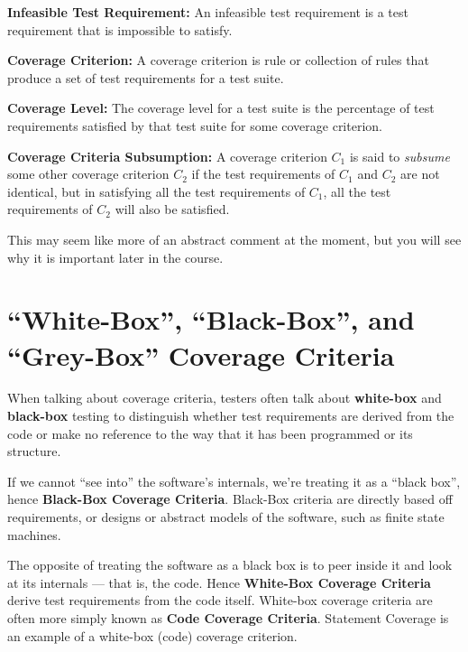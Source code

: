 
{\bf Infeasible Test Requirement:} An infeasible test requirement is a test
requirement that is impossible to satisfy.


{\bf Coverage Criterion:} A coverage criterion is rule or collection of rules
that produce a set of test requirements for a test suite.

{\bf Coverage Level:} The coverage level for a test suite is the percentage of
test requirements satisfied by that test suite for some coverage criterion.


{\bf Coverage Criteria Subsumption:} A coverage criterion $C_1$ is said to {\it
subsume} some other coverage criterion $C_2$ if the test requirements of $C_1$
and $C_2$ are not identical, but in satisfying all the test requirements of
$C_1$, all the test requirements of $C_2$ will also be satisfied.

This may seem like more of an abstract comment at the moment, but you will see
why it is important later in the course. 


\section{``White-Box'', ``Black-Box'', and ``Grey-Box'' Coverage Criteria}

When talking about coverage criteria, testers often talk about {\bf white-box}
and {\bf black-box} testing to distinguish whether test requirements are derived
from the code or make no reference to the way that it has been programmed or its
structure. 

If we cannot ``see into'' the software's internals, we're treating it as a
``black box'', hence {\bf Black-Box Coverage Criteria}. Black-Box criteria are
directly based off requirements, or designs or abstract models of the software,
such as finite state machines. 

The opposite of treating the software as a black box is to peer inside it and
look at its internals --- that is, the code. Hence {\bf White-Box Coverage Criteria}
derive test requirements from the code itself. White-box coverage criteria are
often more simply known as {\bf Code Coverage Criteria}. Statement Coverage is
an example of a white-box (code) coverage criterion. 

